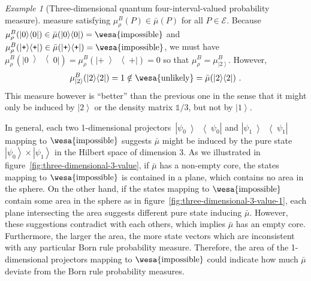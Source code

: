\documentclass[12pt]{iopart}
\theoremstyle{remark}
\newtheorem{example}{Example}
\newcommand{\events}{\ensuremath{\mathcal{E}}}
\newcommand{\imposs}{{\mbox{\wesa{impossible}}}}
\newcommand{\unlikely}{{\mbox{\wesa{unlikely}}}}
\newcommand{\ket}[1]{{\left\vert{#1}\right\rangle}}
\newcommand{\op}[2]{\ensuremath{\left\vert{#1}\middle\rangle\middle\langle{#2}\right\vert}}
\newcommand{\proj}[1]{\op{#1}{#1}}
\newcommand{\ps}{\texttt{+}}
\begin{document}
\begin{example}[Three-dimensional quantum four-interval-valued probability
measure]
measure satisfying $\mu_{\rho}^{B}(P)\in\bar{\mu}(P)$ for all $P\in\events$.
Because $\mu_{\rho}^{B}(\proj{0})\in\bar{\mu}(\proj{0})=\imposs$
and $\mu_{\rho}^{B}(\proj{\ps})\in\bar{\mu}(\proj{\ps})=\imposs$,
we must have $\mu_{\rho}^{B}(\proj{0})=\mu_{\rho}^{B}(\proj{\ps})=0$
so that $\mu_{\rho}^{B}=\mu_{\ket{2}}^{B}$. However, 
\begin{equation}
\mu_{\ket{2}}^{B}(\proj{2})=1\notin\unlikely=\bar{\mu}(\proj{2})\textrm{ .}
\end{equation}
This measure however is ``better'' than the previous one in the
sense that it might only be induced by $\ket{2}$ or the density matrix
$\mathbb{1} / 3$, but not by $\ket{1}$. \end{example}

In general, each two 1-dimensional projectors~$\proj{\psi_{0}}$
and $\proj{\psi_{1}}$ mapping to $\imposs$ suggests $\bar{\mu}$
might be induced by the pure state~$\ket{\psi_{0}}\times\ket{\psi_{1}}$
in the Hilbert space of dimension 3. As we illustrated in figure~\ref{fig:three-dimensional-3-value},
if $\bar{\mu}$ has a non-empty core, the states mapping to $\imposs$
is contained in a plane, which contains no area in the sphere. On
the other hand, if the states mapping to $\imposs$ contain some area
in the sphere as in figure~\ref{fig:three-dimensional-3-value-1},
each plane intersecting the area suggests different pure state inducing
$\bar{\mu}$. However, these suggestions contradict with each others,
which implies $\bar{\mu}$ has an empty core. Furthermore, the larger
the area, the more state vectors which are inconsistent with any particular
Born rule probability measure. Therefore, the area of the 1-dimensional
projectors mapping to $\imposs$ could indicate how much $\bar{\mu}$
deviate from the Born rule probability measures.
\end{document}
